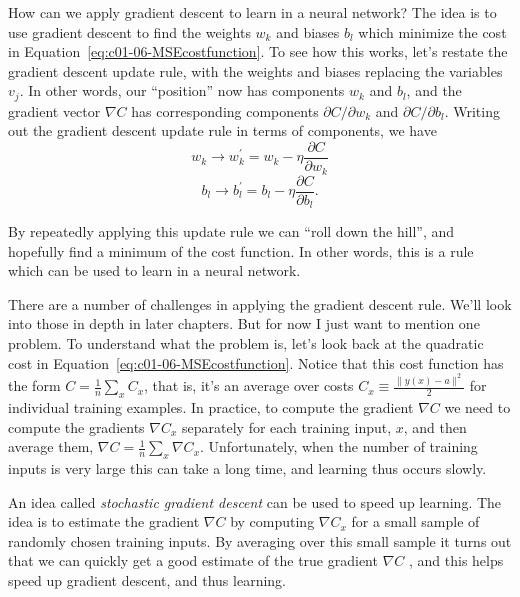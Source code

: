 How can we apply gradient descent to learn in a neural network? The idea is to use gradient descent to find the weights $w_k$ and biases $b_l$ which minimize the cost in Equation~\ref{eq:c01-06-MSEcostfunction}. To see how this works, let's restate the gradient descent update rule, with the weights and biases replacing the variables $v_j$. In other words, our ``position'' now has components $w_k$ and $b_l$, and the gradient vector $\nabla C$ has corresponding components $\partial C / \partial w_{k}$ and $\partial C / \partial b_{l}$. Writing out the gradient descent update rule in terms of components, we have 
\begin{equation}
w_{k} \rightarrow w_{k}^{\prime}=w_{k}-\eta \frac{\partial C}{\partial w_{k}}
\label{eq:c01-16-graddescupdate}
\end{equation}
\begin{equation}
b_{l} \rightarrow b_{l}^{\prime}=b_{l}-\eta \frac{\partial C}{\partial b_{l}}.
\label{eq:c01-17-graddescupdate}
\end{equation}

By repeatedly applying this update rule we can ``roll down the hill'', and hopefully find a minimum of the cost function. In other words, this is a rule which can be used to learn in a neural network.

There are a number of challenges in applying the gradient descent rule. We'll look into those in depth in later chapters. But for now I just want to mention one problem. To understand what the problem is, let's look back at the quadratic cost in Equation~\ref{eq:c01-06-MSEcostfunction}. Notice that this cost function has the form $C=\frac{1}{n} \sum_{x} C_{x}$, that is, it's an average over costs $C_{x} \equiv \frac{\parallel y(x)-a \parallel ^{2}}{2}$ for individual training examples. In practice, to compute the gradient $\nabla C$ we need to compute the gradients $\nabla C_{x}$ separately for each training input, $x$, and then average them, $\nabla C=\frac{1}{n} \sum_{x} \nabla C_{x}$. Unfortunately, when the number of training inputs is very large this can take a long time, and learning thus occurs slowly.

An idea called \textit{stochastic gradient descent} can be used to speed up learning. The idea is to estimate the gradient $\nabla C$ by computing $\nabla C_x$ for a small sample of randomly chosen training inputs. By averaging over this small sample it turns out that we can quickly get a good estimate of the true gradient $\nabla C$ , and this helps speed up gradient descent, and thus learning.

